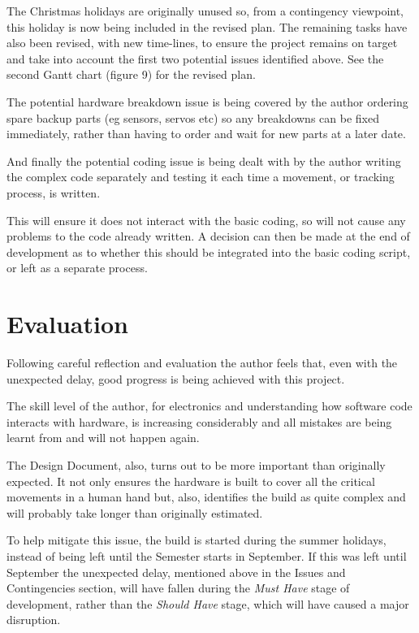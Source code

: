 \documentclass[progress]{cmpreport}
\begin{document}
The Christmas holidays are originally unused so, from a contingency viewpoint, this holiday is now being included in the revised plan. The remaining tasks have also been revised, with new time-lines, to ensure the project remains on target and take into account the first two potential issues identified above. See the second Gantt chart (figure 9) for the revised plan. 

The potential hardware breakdown issue is being covered by the author ordering spare backup parts (eg sensors, servos etc) so any breakdowns can be fixed immediately, rather than having to order and wait for new parts at a later date.

And finally the potential coding issue is being dealt with by the author writing the complex code separately and testing it each time a movement, or tracking process, is written. 

This will ensure it does not interact with the basic coding, so will not cause any problems to the code already written. A decision can then be made at the end of development as to whether this should be integrated into the basic coding script, or left as a separate process.


\section{Evaluation}
Following careful reflection and evaluation the author feels that, even with the unexpected delay, good progress is being achieved with this project. 

The skill level of the author, for electronics and understanding how software code interacts with hardware, is increasing considerably and all mistakes are being learnt from and will not happen again.

The Design Document, also, turns out to be more important than originally expected. It not only ensures the hardware is built to cover all the critical movements in a human hand but, also, identifies the build as quite complex and will probably take longer than originally estimated. 

To help mitigate this issue, the build is started during the summer holidays, instead of being left until the Semester starts in September. If this was left until September the unexpected delay, mentioned above in the Issues and Contingencies section, will have fallen during the \textit{Must Have} stage of development, rather than the \textit{Should Have} stage, which will have caused a major disruption.
\end{document}
